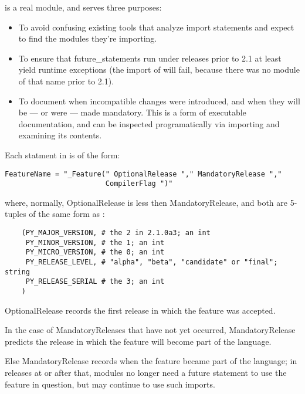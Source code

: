 
 is a real module, and serves three purposes:

\begin{itemize}

\item To avoid confusing existing tools that analyze import statements
      and expect to find the modules they're importing.

\item To ensure that future_statements run under releases prior to 2.1
      at least yield runtime exceptions (the import of
       will fail, because there was no module of
      that name prior to 2.1). 

\item To document when incompatible changes were introduced, and when they
      will be --- or were --- made mandatory.  This is a form of executable
      documentation, and can be inspected programatically via importing
       and examining its contents.

\end{itemize}

Each statment in  is of the form:

\begin{verbatim}
FeatureName = "_Feature(" OptionalRelease "," MandatoryRelease ","
                        CompilerFlag ")"
\end{verbatim}

where, normally, OptionalRelease is less then MandatoryRelease, and
both are 5-tuples of the same form as :

\begin{verbatim}
    (PY_MAJOR_VERSION, # the 2 in 2.1.0a3; an int
     PY_MINOR_VERSION, # the 1; an int
     PY_MICRO_VERSION, # the 0; an int
     PY_RELEASE_LEVEL, # "alpha", "beta", "candidate" or "final"; string
     PY_RELEASE_SERIAL # the 3; an int
    )
\end{verbatim}

OptionalRelease records the first release in which the feature was
accepted. 

In the case of MandatoryReleases that have not yet occurred,
MandatoryRelease predicts the release in which the feature will become
part of the language.

Else MandatoryRelease records when the feature became part of the
language; in releases at or after that, modules no longer need a
future statement to use the feature in question, but may continue to
use such imports. 

